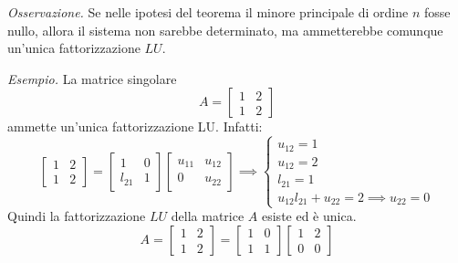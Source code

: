 \textit{Osservazione.}
Se nelle ipotesi del teorema il minore principale di ordine $n$ fosse nullo, allora il sistema non sarebbe determinato, ma ammetterebbe comunque un'unica fattorizzazione $\displaystyle LU$.

\textit{Esempio.}
La matrice singolare
\begin{equation*}
    A = \begin{bmatrix}
        1&2\\
        1&2
    \end{bmatrix}
\end{equation*}
ammette un'unica fattorizzazione LU. Infatti:
\begin{equation*}
    \begin{bmatrix}
        1&2\\
        1&2
    \end{bmatrix}=
    \begin{bmatrix}
        1&0\\
        l_{21}&1
    \end{bmatrix}\begin{bmatrix}
        u_{11}&u_{12}\\
        0&u_{22}
    \end{bmatrix}\implies \begin{cases}
        u_{12}=1\\
        u_{12}=2\\
        l_{21}=1\\
        u_{12}l_{21}+u_{22}=2\implies u_{22}=0
    \end{cases}
\end{equation*}
Quindi la fattorizzazione $\displaystyle LU$ della matrice $A$ esiste ed è unica.
\begin{equation*}
    A=\begin{bmatrix}
        1&2\\
        1&2
    \end{bmatrix}=
    \begin{bmatrix}
        1&0\\
        1&1
    \end{bmatrix}\begin{bmatrix}
        1&2\\
        0&0
    \end{bmatrix}
\end{equation*}

